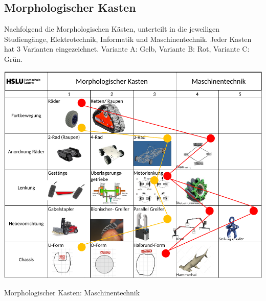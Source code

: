 \subsection{Morphologischer Kasten}\label{Morphologischer Kasten}
Nachfolgend die Morphologischen Kästen, unterteilt in die jeweiligen Studiengänge, Elektrotechnik, Informatik und Maschinentechnik. Jeder Kasten hat 3 Varianten eingezeichnet. Variante A: Gelb, Variante B: Rot, Variante C: Grün.

\begin{table}[H]
\centering
\includegraphics[width=\textwidth]{assets/MK_Maschinentechnik.pdf}
\caption{Morphologischer Kasten: Maschinentechnik}
\label{table:MK-Maschinentechnik}
\end{table}
\newpage

